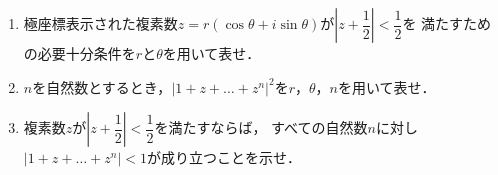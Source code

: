 \documentclass[../../main.tex]{subfiles}
\begin{document}
\begin{enumerate}
  \item 極座標表示された複素数$z=r(\cos\theta+i\sin\theta)$が$\displaystyle \left| z+\dfrac{1}{2} \right| < \dfrac{1}{2}$を
    満たすための必要十分条件を$r$と$\theta$を用いて表せ．
  \item $n$を自然数とするとき，$|1+z+\dots+z^n|^2$を$r$，$\theta$，$n$を用いて表せ．
  \item 複素数$z$が$\displaystyle \left| z+\dfrac{1}{2} \right| < \dfrac{1}{2}$を満たすならば，
    すべての自然数$n$に対し$|1+z+\dots+z^n|<1$が成り立つことを示せ．
\end{enumerate}
\end{document}
